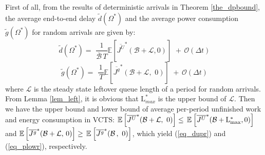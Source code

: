 \documentclass[11pt,journal, onecolumn]{./IEEEtran}
\newcommand{\red}{\color{black}}
\begin{document}
{\red First of all, from the results of deterministic arrivals in Theorem \ref{the_dpbound},} the average end-to-end delay $\widetilde d(\Omega^*)$ and the average power consumption $\widetilde g(\Omega^*)$ for random arrivals are given by:
\[\widetilde d\left( {{\Omega ^*}} \right) = \,\,\frac{1}{{\overline {\mathcal B} \,T}}\mathbb E\left[ {{{\overline {{J^U}} }^*}(\mathcal B + \mathcal L,0)} \right]\,\, + \,\mathcal O\left( {\Delta t}\right)\]
\[\widetilde g\left( {{\Omega ^*}} \right) = \,\,\frac{1}{{\,T}}\mathbb E\left[ {{{\overline {{J^{g}}} }^*}(\mathcal B + \mathcal L,\,\,0)} \right]\,\, + \,\mathcal O\left( {\Delta t}\right)\]
where $\mathcal L$ is the steady state leftover queue length of a period for random arrivals. {\red From Lemma \ref{lem_left}, it is obvious that $\mathrm L^*_{max}$ is the upper bound of $\mathcal L$.} Then we have the upper bound and lower bound of average per-period unfinished work and energy consumption in VCTS:
$\mathbb E\left[ {{{\overline {{J^U}} }^*}(\mathcal B + \mathcal L,\,\,0)} \right] \le {\mkern 1mu} {\mkern 1mu} {\mkern 1mu} \mathbb E{\mkern 1mu} \left[ {{{\overline {{J^U}} }^*}(\mathcal B + {\rm{L}}_{\max }^*,0)} \right]$ and $\mathbb E\left[ {{{\overline {{J^g}} }^*}(\mathcal B + \mathcal L,\,0)} \right] \ge {\mkern 1mu} {\mkern 1mu} {\mkern 1mu} \mathbb E{\mkern 1mu} \left[ {{{\overline {{J^g}} }^*}(\mathcal B\,,\,\,0)} \right]$, 
which yield (\ref{eq_dupr}) and (\ref{eq_plowr}), respectively.






    
\end{document}
